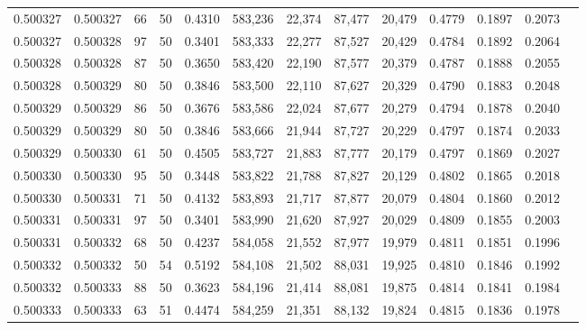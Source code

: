\begin{tabular}{rrrrrrrrrrrrr}
0.500327 & 0.500327 &    66 &  50 &                                     0.4310 & 583,236 &  22,374 &  87,477 &  20,479 & 0.4779 & 0.1897 & 0.2073 \\
0.500327 & 0.500328 &    97 &  50 &                                     0.3401 & 583,333 &  22,277 &  87,527 &  20,429 & 0.4784 & 0.1892 & 0.2064 \\
0.500328 & 0.500328 &    87 &  50 &                                     0.3650 & 583,420 &  22,190 &  87,577 &  20,379 & 0.4787 & 0.1888 & 0.2055 \\
0.500328 & 0.500329 &    80 &  50 &                                     0.3846 & 583,500 &  22,110 &  87,627 &  20,329 & 0.4790 & 0.1883 & 0.2048 \\
0.500329 & 0.500329 &    86 &  50 &                                     0.3676 & 583,586 &  22,024 &  87,677 &  20,279 & 0.4794 & 0.1878 & 0.2040 \\
0.500329 & 0.500329 &    80 &  50 &                                     0.3846 & 583,666 &  21,944 &  87,727 &  20,229 & 0.4797 & 0.1874 & 0.2033 \\
0.500329 & 0.500330 &    61 &  50 &                                     0.4505 & 583,727 &  21,883 &  87,777 &  20,179 & 0.4797 & 0.1869 & 0.2027 \\
0.500330 & 0.500330 &    95 &  50 &                                     0.3448 & 583,822 &  21,788 &  87,827 &  20,129 & 0.4802 & 0.1865 & 0.2018 \\
0.500330 & 0.500331 &    71 &  50 &                                     0.4132 & 583,893 &  21,717 &  87,877 &  20,079 & 0.4804 & 0.1860 & 0.2012 \\
0.500331 & 0.500331 &    97 &  50 &                                     0.3401 & 583,990 &  21,620 &  87,927 &  20,029 & 0.4809 & 0.1855 & 0.2003 \\
0.500331 & 0.500332 &    68 &  50 &                                     0.4237 & 584,058 &  21,552 &  87,977 &  19,979 & 0.4811 & 0.1851 & 0.1996 \\
0.500332 & 0.500332 &    50 &  54 &                                     0.5192 & 584,108 &  21,502 &  88,031 &  19,925 & 0.4810 & 0.1846 & 0.1992 \\
0.500332 & 0.500333 &    88 &  50 &                                     0.3623 & 584,196 &  21,414 &  88,081 &  19,875 & 0.4814 & 0.1841 & 0.1984 \\
0.500333 & 0.500333 &    63 &  51 &                                     0.4474 & 584,259 &  21,351 &  88,132 &  19,824 & 0.4815 & 0.1836 & 0.1978 \\

\end{tabular}
